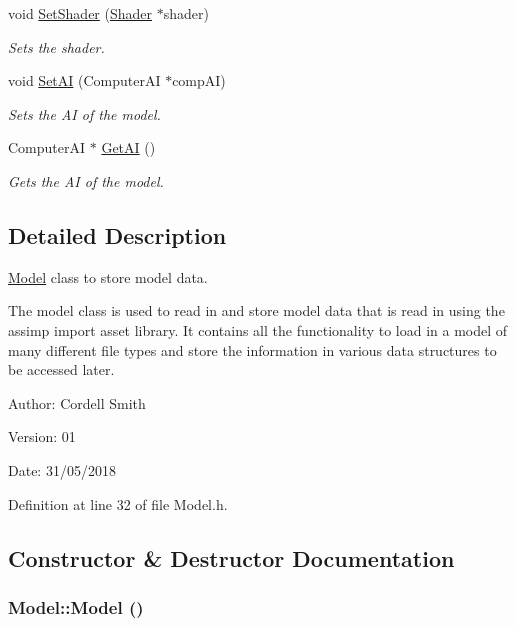 \begin{CompactItemize}
void \hyperlink{class_model_a1a4b42427c675bccfdd93d3b049cee5}{SetShader} (\hyperlink{class_shader}{Shader} $\ast$shader)
\begin{CompactList}\small\item\em Sets the shader. \item\end{CompactList}\item 
void \hyperlink{class_model_88a59a41b18480246ade2f6a22b4e61d}{SetAI} (ComputerAI $\ast$compAI)
\begin{CompactList}\small\item\em Sets the AI of the model. \item\end{CompactList}\item 
ComputerAI $\ast$ \hyperlink{class_model_cadb88d0d8d9839884f9b55aa6eb9235}{GetAI} ()
\begin{CompactList}\small\item\em Gets the AI of the model. \item\end{CompactList}\end{CompactItemize}


\subsection{Detailed Description}
\hyperlink{class_model}{Model} class to store model data. 

The model class is used to read in and store model data that is read in using the assimp import asset library. It contains all the functionality to load in a model of many different file types and store the information in various data structures to be accessed later.

\begin{Desc}
\item[Author:]Cordell Smith \end{Desc}
\begin{Desc}
\item[Version:]01 \end{Desc}
\begin{Desc}
\item[Date:]31/05/2018 \end{Desc}


Definition at line 32 of file Model.h.

\subsection{Constructor \& Destructor Documentation}
\hypertarget{class_model_e3b375de5f6df4faf74a95d64748e048}{
\subsubsection[Model]{\setlength{\rightskip}{0pt plus 5cm}Model::Model ()}}
\label{class_model_e3b375de5f6df4faf74a95d64748e048}


